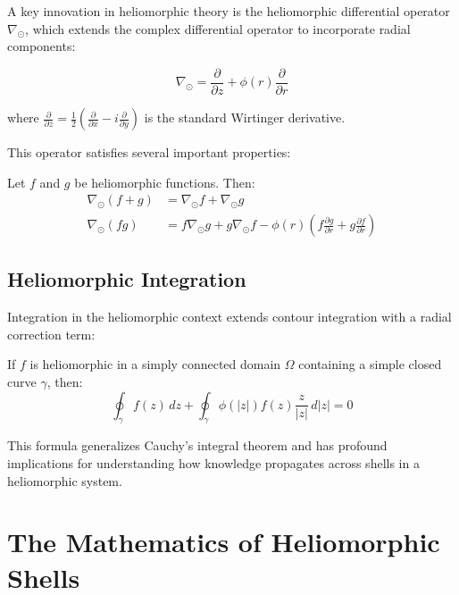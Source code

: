 A key innovation in heliomorphic theory is the heliomorphic differential operator $\nabla_{\odot}$, which extends the complex differential operator to incorporate radial components:

\begin{equation}
\nabla_{\odot} = \frac{\partial}{\partial z} + \phi(r) \frac{\partial}{\partial r}
\end{equation}

where $\frac{\partial}{\partial z} = \frac{1}{2}\left(\frac{\partial}{\partial x} - i\frac{\partial}{\partial y}\right)$ is the standard Wirtinger derivative.

This operator satisfies several important properties:

\begin{proposition}
Let $f$ and $g$ be heliomorphic functions. Then:
\begin{align}
\nabla_{\odot}(f + g) &= \nabla_{\odot}f + \nabla_{\odot}g \\
\nabla_{\odot}(fg) &= f\nabla_{\odot}g + g\nabla_{\odot}f - \phi(r)(f\frac{\partial g}{\partial r} + g\frac{\partial f}{\partial r})
\end{align}
\end{proposition}

\subsection{Heliomorphic Integration}

Integration in the heliomorphic context extends contour integration with a radial correction term:

\begin{theorem}
If $f$ is heliomorphic in a simply connected domain $\Omega$ containing a simple closed curve $\gamma$, then:
\begin{equation}
\oint_{\gamma} f(z) \, dz + \oint_{\gamma} \phi(|z|) f(z) \frac{z}{|z|} \, d|z| = 0
\end{equation}
\end{theorem}

This formula generalizes Cauchy's integral theorem and has profound implications for understanding how knowledge propagates across shells in a heliomorphic system.

\section{The Mathematics of Heliomorphic Shells}

